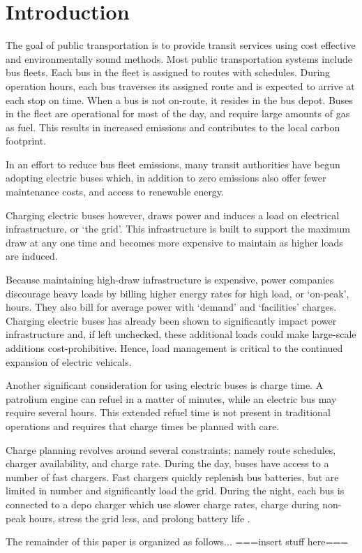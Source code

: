 \section{Introduction}
The goal of public transportation is to provide transit services using cost effective and environmentally sound methods. Most public transportation systems include bus fleets.  Each bus in the fleet is assigned to routes with schedules. During operation hours, each bus traverses its assigned route and is expected to arrive at each stop on time. When a bus is not on-route, it resides in the bus depot. Buses in the fleet are operational for most of the day, and require large amounts of gas as fuel. This results in increased emissions and contributes to the local carbon footprint.  
\par In an effort to reduce bus fleet emissions, many transit authorities have begun adopting electric buses which, in addition to zero emissions also offer fewer maintenance costs, and access to renewable energy\cite{poornesh_comparative_2020}.
\par Charging electric buses however, draws power and induces a load on electrical infrastructure, or `the grid'. This infrastructure is built to support the maximum draw at any one time and becomes more expensive to maintain as higher loads are induced. 
\par Because maintaining high-draw infrastructure is expensive, power companies discourage heavy loads by billing higher energy rates for high load, or `on-peak', hours.  They also bill for average power with `demand' and `facilities' charges.  Charging electric buses has already been shown to significantly impact power infrastructure \cite{stahleder_impact_2019}\cite{deb_impact_2017}\cite{boonraksa_impact_2019} and, if left unchecked, these additional loads could make large-scale additions cost-prohibitive. Hence, load management is critical to the continued expansion of electric vehicals.  
\par Another significant consideration for using electric buses is charge time. A patrolium engine can refuel in a matter of minutes, while an electric bus may require several hours. This extended refuel time is not present in traditional operations and requires that charge times be planned with care. 
\par Charge planning revolves around several constraints; namely route schedules, charger availability, and charge rate.  During the day, buses have access to a number of fast chargers.  Fast chargers quickly replenish bus batteries, but are limited in number and significantly load the grid.  During the night, each bus is connected to a depo charger which use slower charge rates, charge during non-peak hours, stress the grid less, and prolong battery life \cite{houbbadi_optimal_2019}.
\par The remainder of this paper is organized as follows... ===insert stuff here===

